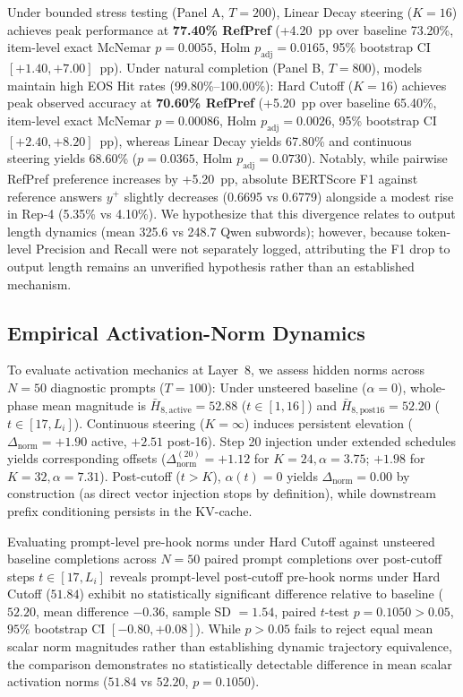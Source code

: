 \documentclass[runningheads]{llncs}
\begin{document}
Under bounded stress testing (Panel A, $T=200$), Linear Decay steering ($K{=}16$) achieves peak performance at \textbf{77.40\% RefPref} (+4.20~pp over baseline 73.20\%, item-level exact McNemar $p=0.0055$, Holm $p_{\text{adj}}=0.0165$, 95\% bootstrap CI $[+1.40, +7.00]$~pp). Under natural completion (Panel B, $T=800$), models maintain high EOS Hit rates (99.80\%--100.00\%): Hard Cutoff ($K{=}16$) achieves peak observed accuracy at \textbf{70.60\% RefPref} (+5.20~pp over baseline 65.40\%, item-level exact McNemar $p=0.00086$, Holm $p_{\text{adj}}=0.0026$, 95\% bootstrap CI $[+2.40, +8.20]$~pp), whereas Linear Decay yields 67.80\% and continuous steering yields 68.60\% ($p=0.0365$, Holm $p_{\text{adj}}=0.0730$). Notably, while pairwise RefPref preference increases by +5.20~pp, absolute BERTScore F1 against reference answers $y^+$ slightly decreases (0.6695 vs 0.6779) alongside a modest rise in Rep-4 (5.35\% vs 4.10\%). We hypothesize that this divergence relates to output length dynamics (mean 325.6 vs 248.7 Qwen subwords); however, because token-level Precision and Recall were not separately logged, attributing the F1 drop to output length remains an unverified hypothesis rather than an established mechanism.

\subsection{Empirical Activation-Norm Dynamics}\label{sec:norm_dynamics}
To evaluate activation mechanics at Layer~8, we assess hidden norms across $N=50$ diagnostic prompts ($T=100$):
Under unsteered baseline ($\alpha=0$), whole-phase mean magnitude is $\bar{H}_{8,\text{active}} = 52.88$ ($t \in [1, 16]$) and $\bar{H}_{8,\text{post16}} = 52.20$ ($t \in [17, L_i]$). Continuous steering ($K=\infty$) induces persistent elevation ($\Delta_{\text{norm}} = +1.90$ active, $+2.51$ post-16). Step 20 injection under extended schedules yields corresponding offsets ($\Delta_{\text{norm}}^{(20)}=+1.12$ for $K=24, \alpha=3.75$; $+1.98$ for $K=32, \alpha=7.31$). Post-cutoff ($t > K$), $\alpha(t)=0$ yields $\Delta_{\text{norm}} = 0.00$ by construction (as direct vector injection stops by definition), while downstream prefix conditioning persists in the KV-cache.

Evaluating prompt-level pre-hook norms under Hard Cutoff against unsteered baseline completions across $N=50$ paired prompt completions over post-cutoff steps $t \in [17, L_i]$ reveals prompt-level post-cutoff pre-hook norms under Hard Cutoff ($51.84$) exhibit no statistically significant difference relative to baseline ($52.20$, mean difference $-0.36$, sample SD $= 1.54$, paired $t$-test $p = 0.1050 > 0.05$, $95\%$ bootstrap CI $[-0.80, +0.08]$). While $p > 0.05$ fails to reject equal mean scalar norm magnitudes rather than establishing dynamic trajectory equivalence, the comparison demonstrates no statistically detectable difference in mean scalar activation norms ($51.84$ vs $52.20$, $p=0.1050$).
\end{document}
